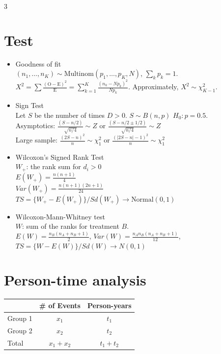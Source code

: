 \documentclass[a4paper,10pt]{article}
\begin{document}
\begin{multicols}{3}
\begin{itemize}
\end{itemize}

\section*{Test}
\begin{itemize}
    \item Goodness of fit\\
    $(n_1, \dots, n_K) \sim \text{Multinom}(p_1, \dots, p_K, N)$, $\sum_k p_k = 1$.  \\
    $X^2 = \sum \frac{(\text{O} - \text{E})^2}{\text{E}} = \sum_{k=1}^K \frac{(n_k - N p_k)^2}{N p_k}$.  
    Approximately, $X^2 \sim \chi^2_{K-1}$.
    \item Sign Test\\
    Let $S$ be the number of times $D > 0$.
    $S\sim B(n, p)$
    $H_0 : p = 0.5$. \\
    Asymptotics: $\frac{(S - n/2)}{\sqrt{n/4}} \sim Z$ or $\frac{(S - n/2 \pm 1/2)}{\sqrt{n/4}} \sim Z$  \\ 
    Large sample: $\frac{(2S - n)^2}{n} \sim \chi^2_1$ or $\frac{(|2S - n| - 1)^2}{n} \sim \chi^2_1$ 
    \item Wilcoxon's Signed Rank Test\\
    $W_+$: the rank sum for $d_i>0$\\
    $E(W_+) = \frac{n(n+1)}{4}$ \\
    $Var(W_+) = \frac{n(n+1)(2n+1)}{24}$ \\
    $TS = \{ W_+ - E(W_+) \} / Sd(W_+) \to \text{Normal}(0, 1)$
    \item Wilcoxon-Mann-Whitney test\\
    $W$: sum of the ranks for treatment $B$.\\
    $E(W) = \frac{n_B (n_A + n_B + 1)}{2}$,
    $Var(W) = \frac{n_A n_B (n_A + n_B + 1)}{12}$,
    $TS = \{ W - E(W) \} / Sd(W) \to N(0, 1)$       
\end{itemize}

\section*{Person-time analysis}
    \begin{tabular}{l c c}
    \hline
     & \# of Events & Person-years \\
    \hline
    Group 1 & $x_1$ & $t_1$ \\
    Group 2 & $x_2$ & $t_2$ \\
    \hline
    Total & $x_1 + x_2$ & $t_1 + t_2$ \\
    \hline
    \end{tabular}
    

\end{multicols}
\end{document}
